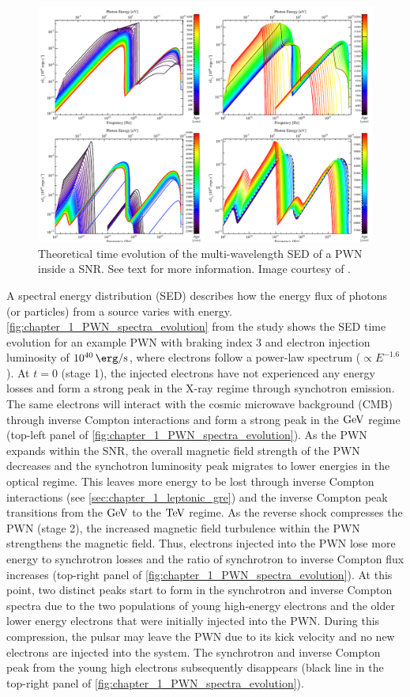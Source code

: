 \begin{figure}[h!]
    \centering
    \includegraphics[width=\textwidth]{04_Introduction/Images/pulsar_wind_nebula/pwn_spectra_evolution.pdf}
    \caption{Theoretical time evolution of the multi-wavelength SED of a PWN inside a SNR. See text for more information. Image courtesy of \cite{2009ApJ...703.2051G}.}
    \label{fig:chapter_1_PWN_spectra_evolution}
\end{figure}
A spectral energy distribution (SED) describes how the energy flux of photons (or particles) from a source varies with energy. \autoref{fig:chapter_1_PWN_spectra_evolution} from the study \cite{2009ApJ...703.2051G} shows the SED time evolution for an example PWN with braking index $3$ and electron injection luminosity of $10^{40}\,\ergspersec$, where electrons follow a power-law spectrum ($\propto E^{-1.6}$).
\newpar
At $t=0$ (stage 1), the injected electrons have not experienced any energy losses and form a strong peak in the X-ray regime through synchotron emission. The same electrons will interact with the cosmic microwave background (CMB) through inverse Compton interactions and form a strong peak in the $\si{\giga\electronvolt}$ regime  (top-left panel of \autoref{fig:chapter_1_PWN_spectra_evolution}). As the PWN expands within the SNR, the overall magnetic field strength of the PWN decreases and the synchotron luminosity peak migrates to lower energies in the optical regime. This leaves more energy to be lost through inverse Compton interactions (see \autoref{sec:chapter_1_leptonic_gre}) and the inverse Compton peak transitions from the $\si{\giga\electronvolt}$ to the $\TeV$ regime.
\newpar
As the reverse shock compresses the PWN (stage 2), the increased magnetic field turbulence within the PWN strengthens the magnetic field. Thus, electrons injected into the PWN lose more energy to synchrotron losses and the ratio of synchrotron to inverse Compton flux increases (top-right panel of \autoref{fig:chapter_1_PWN_spectra_evolution}). At this point, two distinct peaks start to form in the synchrotron and inverse Compton spectra due to the two populations of young high-energy electrons and the older lower energy electrons that were initially injected into the PWN. During this compression, the pulsar may leave the PWN due to its kick velocity and no new electrons are injected into the system. The synchrotron and inverse Compton peak from the young high electrons subsequently disappears (black line in the top-right panel of \autoref{fig:chapter_1_PWN_spectra_evolution}).

